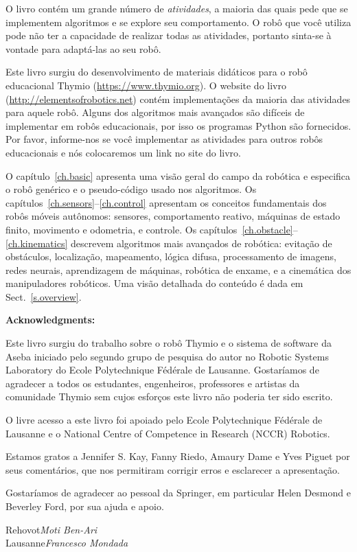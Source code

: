 O livro contém um grande número de \emph{atividades}, a maioria das quais pede que se implementem algoritmos e se explore seu comportamento. O robô que você utiliza pode não ter a capacidade de realizar todas as atividades, portanto sinta-se à vontade para adaptá-las ao seu robô.

Este livro surgiu do desenvolvimento de materiais didáticos para o robô educacional Thymio (\url{https://www.thymio.org}). O website do livro (\url{http://elementsofrobotics.net}) contém implementações da maioria das atividades para aquele robô. Alguns dos algoritmos mais avançados são difíceis de implementar em robôs educacionais, por isso os programas Python são fornecidos. Por favor, informe-nos se você implementar as atividades para outros robôs educacionais e nós colocaremos um link no site do livro.

O capítulo~\ref{ch.basic} apresenta uma visão geral do campo da robótica e especifica o robô genérico e o pseudo-código usado nos algoritmos. Os capítulos~\ref{ch.sensors}--\ref{ch.control} apresentam os conceitos fundamentais dos robôs móveis autônomos: sensores, comportamento reativo, máquinas de estado finito, movimento e odometria, e controle. Os capítulos~\ref{ch.obstacle}--\ref{ch.kinematics} descrevem algoritmos mais avançados de robótica: evitação de obstáculos, localização, mapeamento, lógica difusa, processamento de imagens, redes neurais, aprendizagem de máquinas, robótica de enxame, e a cinemática dos manipuladores robóticos. Uma visão detalhada do conteúdo é dada em Sect.~\ref{s.overview}.

\bigskip

\noindent\textbf{Acknowledgments:}

Este livro surgiu do trabalho sobre o robô Thymio e o sistema de software da Aseba iniciado pelo segundo grupo de pesquisa do autor no Robotic Systems Laboratory do Ecole Polytechnique F\'{e}d\'{e}rale de Lausanne. Gostaríamos de agradecer a todos os estudantes, engenheiros, professores e artistas da comunidade Thymio sem cujos esforços este livro não poderia ter sido escrito.

O livre acesso a este livro foi apoiado pelo Ecole Polytechnique F\'{e}d\'{e}rale de Lausanne e o National Centre of Competence in Research (NCCR) Robotics.

Estamos gratos a Jennifer S. Kay, Fanny Riedo, Amaury Dame e Yves Piguet por seus comentários, que nos permitiram corrigir erros e esclarecer a apresentação.

Gostaríamos de agradecer ao pessoal da Springer, em particular Helen Desmond e Beverley Ford, por sua ajuda e apoio.

\bigskip

\begin{flushright}\noindent
Rehovot\hfill {\it Moti Ben-Ari}\\
Lausanne\hfill {\it Francesco Mondada}\\
\end{flushright}
 
\tableofcontents
